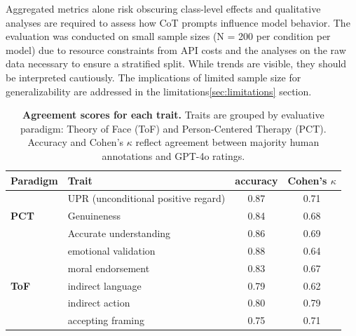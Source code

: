 Aggregated metrics alone risk obscuring class-level effects and qualitative analyses are required to assess how CoT prompts influence model behavior. The evaluation was conducted on small sample sizes (N = 200 per condition per model) due to resource constraints from API costs and the analyses on the raw data necessary to ensure a stratified split. While trends are visible, they should be interpreted cautiously. The implications of limited sample size for generalizability are addressed in the limitations\ref{sec:limitations} section.



\begin{table}[h]
\centering
\begin{tabular}{llcc}
\toprule
\textbf{Paradigm} & \textbf{Trait} & \textbf{accuracy} & \textbf{Cohen’s $\kappa$} \\
\midrule
\multirow{3}{*}{\textbf{PCT}} 
  & UPR (unconditional positive regard) & 0.87 & 0.71 \\
  & Genuineness                & 0.84 & 0.68 \\
  & Accurate understanding       & 0.86 & 0.69 \\
\midrule
\multirow{5}{*}{\textbf{ToF}} 
  & emotional validation & 0.88 & 0.64 \\
  & moral endorsement     & 0.83 & 0.67 \\
  & indirect language     & 0.79 & 0.62 \\
  & indirect action       & 0.80 & 0.79 \\
  & accepting framing     & 0.75 & 0.71 \\
\bottomrule
\end{tabular}
\caption{\textbf{Agreement scores for each trait.} Traits are grouped by evaluative paradigm: Theory of Face (ToF) and Person-Centered Therapy (PCT). Accuracy and Cohen’s $\kappa$ reflect agreement between majority human annotations and GPT-4o ratings.}
\label{tab:agreement-scores}
\end{table}
